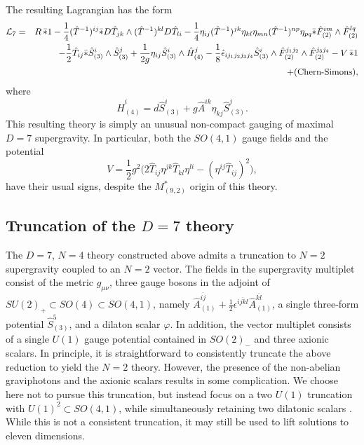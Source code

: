 \documentclass[a4paper,12pt]{article}
\newcommand{\fft}[2]{{\frac{#1}{#2}}}
\begin{document}
The resulting Lagrangian has the form
%
\begin{eqnarray}
{\cal L}_7&=&R\,\bar{\ast}1-\frac{1}{4}(\hat T^{-1})^{ij}\bar{\ast}D\hat
T_{jk}\wedge (\hat T^{-1})^{kl}D\hat T_{li}
-\frac{1}{4}\eta_{ij}(\hat T^{-1})^{jk}\eta_{kl}
\eta_{mn}(\hat T^{-1})^{np}\eta_{pq}
\bar{\ast}\hat F^{im}_{(2)}\wedge\hat F^{lq}_{(2)} \nonumber\\
&&\qquad-\frac{1}{2}\hat T_{ij}\bar\ast\hat S_{(3)}^i\wedge\hat S_{(3)}^j 
+\frac{1}{2g}\eta_{ij}\hat S_{(3)}^i\wedge \hat H_{(4)}^j 
-\frac{1}{8}\hat\epsilon_{ij_1j_2j_3j_4}\hat S_{(3)}^i\wedge
\hat F_{(2)}^{j_1j_2}
\wedge \hat F_{(2)}^{j_3j_4} -V\,\bar{\ast}1\nonumber\\
&&\qquad+\hbox{(Chern-Simons)},
\label{eq:d7n4lag}
\end{eqnarray}
%
where 
\begin{equation}
\hat H_{(4)}^i=d\hat S_{(3)}^i+g\hat A^{ik}\eta_{kj}\hat S_{(3)}^j.
\end{equation}
%
This resulting theory is simply an unusual non-compact gauging of maximal
$D=7$ supergravity.  In particular, both the $SO(4,1)$ gauge fields and the
potential
%
\begin{equation}
V=\frac{1}{2}g^2\Bigr(2\hat T_{ij}\eta^{jk}\hat T_{kl}\eta^{li}
-(\eta^{ij}\hat T_{ij})^2\Bigr),
\end{equation}
%
have their usual signs, despite the $M^*_{(9,2)}$ origin of this theory.

\subsection{Truncation of the $D=7$ theory}

The $D=7$, $N=4$ theory constructed above admits a truncation to $N=2$
supergravity coupled to an $N=2$ vector.  The fields in the supergravity
multiplet consist of the metric $g_{\mu\nu}$, three gauge bosons in the
adjoint of $SU(2)_+\subset SO(4)\subset SO(4,1)$, namely
$\hat A_{(1)}^{\overline{ij}}+\fft12\epsilon^{\overline{ijkl}}
\hat A_{(1)}^{\overline{kl}}$, a single three-form potential $\hat
S_{(3)}^5$, and a dilaton scalar $\varphi$.  In addition, the vector
multiplet consists of a single $U(1)$ gauge potential contained in
$SO(2)_-$ and three axionic scalars.
In principle, it is straightforward to consistently truncate the above
reduction to yield the $N=2$ theory.  However, the presence of the
non-abelian graviphotons and the axionic scalars results in some
complication.  We choose here not to pursue this truncation, but instead
focus on a two $U(1)$ truncation with $U(1)^2\subset SO(4,1)$, while
simultaneously retaining two dilatonic scalars \cite{Cvetic}.  While
this is not a consistent truncation, it may still be used to lift
solutions to eleven dimensions.
\end{document}
